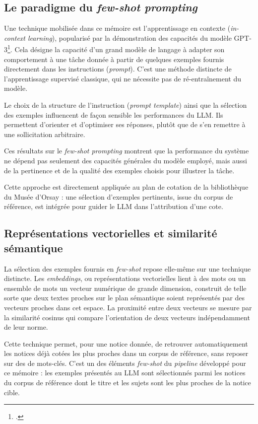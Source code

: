 \subsection{Le paradigme du \textit{few-shot prompting}}
\label{sec:fondamentaux-fewshot}

Une technique mobilisée dans ce mémoire est l'apprentissage en contexte (\textit{in-context learning}), popularisé par la démonstration des capacités du modèle GPT-3\footcite{brown2020}. Cela désigne la capacité d'un grand modèle de langage à adapter son comportement à une tâche donnée à partir de quelques exemples fournis directement dans les instructions (\textit{prompt}). C'est une méthode distincte de l'apprentissage supervisé classique, qui ne nécessite pas de ré-entraînement du modèle.

Le choix de la structure de l'instruction (\textit{prompt template}) ainsi que la sélection des exemples influencent de façon sensible les performances du LLM. Ils permettent d'orienter et d'optimiser ses réponses, plutôt que de s'en remettre à une sollicitation arbitraire.

Ces résultats sur le \textit{few-shot prompting} montrent que la performance du système ne dépend pas seulement des capacités générales du modèle employé, mais aussi de la pertinence et de la qualité des exemples choisis pour illustrer la tâche.

Cette approche est directement appliquée au plan de cotation de la bibliothèque du Musée d'Orsay : une sélection d'exemples pertinents, issue du corpus de référence, est intégrée pour guider le LLM dans l'attribution d'une cote.

\subsection{Représentations vectorielles et similarité sémantique}
\label{sec:fondamentaux-embeddings}

La sélection des exemples fournis en \textit{few-shot} repose elle-même sur une technique distincte. Les \textit{embeddings}, ou représentations vectorielles lient à des mots ou un ensemble de mots un vecteur numérique de grande dimension, construit de telle sorte que deux textes proches sur le plan sémantique soient représentés par des vecteurs proches dans cet espace. La proximité entre deux vecteurs se mesure  par la similarité cosinus qui compare l'orientation de deux vecteurs indépendamment de leur norme.
 
Cette technique permet, pour une notice donnée, de retrouver automatiquement les notices déjà cotées les plus proches dans un corpus de référence, sans reposer sur des de mots-clés. C'est un des éléments  \textit{few-shot} du \textit{pipeline} développé pour ce mémoire : les exemples présentés au LLM sont sélectionnés parmi les notices du corpus de référence dont le titre et les sujets sont les plus proches de la notice cible. 


